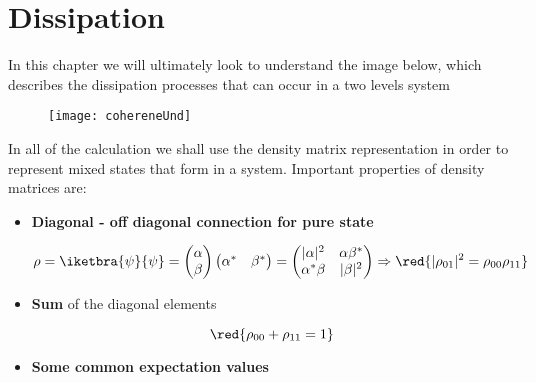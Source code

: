 \section{Dissipation\label{sec:linbland1}}
In this chapter we will ultimately  look to understand the image below,
which  describes the  dissipation processes  that  can occur  in a  two
levels system

\begin{figure}[h]
  \centering \texttt{[image: cohereneUnd]}
\end{figure}

In  all   of  the   calculation  we  shall   use  the   density  matrix
representation  in order  to  represent  mixed states  that  form in  a
system. Important properties of density matrices are:

\begin{itemize}
\item \textbf{Diagonal - off diagonal connection for pure state}

  \begin{equation}\label{dOffD}
    \rho=\iketbra{\psi}{\psi} = \begin{pmatrix}
      \alpha\\\beta
    \end{pmatrix}\begin{pmatrix}
      \alpha^{*}&\beta^{*}
    \end{pmatrix}                   =                   \begin{pmatrix}
      |\alpha|^2&\alpha\beta^{*}\\\alpha^{*}\beta&|\beta|^2
    \end{pmatrix} \Rightarrow \red{|\rho_{01}|^2 = \rho_{00}\rho_{11}}
  \end{equation}
\item \textbf{Sum} of the diagonal elements

  \begin{equation}\label{sum}
    \red{\rho_{00}+\rho_{11}=1}
  \end{equation}
\item \textbf{Some common expectation values}


\end{itemize}
